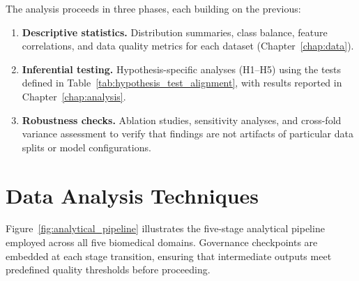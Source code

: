 The analysis proceeds in three phases, each building on the previous:

\begin{enumerate}
    \item \textbf{Descriptive statistics.} Distribution summaries, class balance, feature correlations, and data quality metrics for each dataset (Chapter~\ref{chap:data}).
    \item \textbf{Inferential testing.} Hypothesis-specific analyses (H1--H5) using the tests defined in Table~\ref{tab:hypothesis_test_alignment}, with results reported in Chapter~\ref{chap:analysis}.
    \item \textbf{Robustness checks.} Ablation studies, sensitivity analyses, and cross-fold variance assessment to verify that findings are not artifacts of particular data splits or model configurations.
\end{enumerate}

\section{Data Analysis Techniques}
\label{sec:analysis_techniques}

Figure~\ref{fig:analytical_pipeline} illustrates the five-stage analytical pipeline employed across all five biomedical domains. Governance checkpoints are embedded at each stage transition, ensuring that intermediate outputs meet predefined quality thresholds before proceeding.

